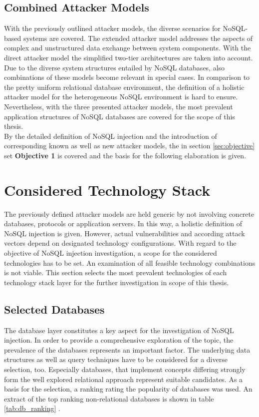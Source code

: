 \subsection{Combined Attacker Models}
With the previously outlined attacker models, the diverse scenarios for NoSQL-based systems are covered. The extended attacker model addresses the aspects of complex and unstructured data exchange between system components. With the direct attacker model the simplified two-tier architectures are taken into account. Due to the diverse system structures entailed by NoSQL databases, also combinations of these models become relevant in special cases. In comparison to the pretty uniform relational database environment, the definition of a holistic attacker model for the heterogeneous NoSQL environment is hard to ensure. Nevertheless, with the three presented attacker models, the most prevalent application structures of NoSQL databases are covered for the scope of this thesis. \\

By the detailed definition of NoSQL injection and the introduction of corresponding known as well as new attacker models, the in section \ref{sec:objective} set \textbf{Objective 1} is covered and the basis for the following elaboration is given.


\section{Considered Technology Stack}

The previously defined attacker models are held generic by not involving concrete databases, protocols or application servers. In this way, a holistic definition of NoSQL injection is given. However, actual vulnerabilities and according attack vectors depend on designated technology configurations. With regard to the objective of NoSQL injection investigation, a scope for the considered technologies has to be set. An examination of all feasible technology combinations is not viable. This section selects the most prevalent technologies of each technology stack layer for the further investigation in scope of this thesis.

\subsection{Selected Databases}
The database layer constitutes a key aspect for the investigation of NoSQL injection. In order to provide a comprehensive exploration of the topic, the prevalence of the databases represents an important factor. The underlying data structures as well as query techniques have to be considered for a diverse selection, too. Especially databases, that implement concepts differing strongly form the well explored relational approach represent suitable candidates. As a basis for the selection, a ranking rating the popularity of databases was used. An extract of the top ranking non-relational databases is shown in table \ref{tab:db_ranking} \cite{Solid2016}.

